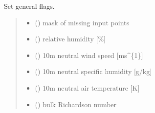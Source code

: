 \documentclass[letterpaper,10pt,english]{sphinxmanual}
\begin{document}
\begin{fulllineitems}
\label{\detokenize{users_guide:AirSeaFluxCode.util_subs.set_flag}}
\pysigstartsignatures
\pysiglinewithargsret
{}
{\sphinxparamcomma {}\sphinxparamcomma {}\sphinxparamcomma {}\sphinxparamcomma {}\sphinxparamcomma {}\sphinxparamcomma {}\sphinxparamcomma {}\sphinxparamcomma {}\sphinxparamcomma {}}
{}
\pysigstopsignatures
\sphinxAtStartPar
Set general flags.
\begin{quote}\begin{description}
\begin{itemize}
\item {}
\sphinxAtStartPar
{} () \textendash{} mask of missing input points

\item {}
\sphinxAtStartPar
{} () \textendash{} relative humidity             {[}\%{]}

\item {}
\sphinxAtStartPar
{} () \textendash{} 10m neutral wind speed        {[}ms\textasciicircum{}\{\sphinxhyphen{}1\}{]}

\item {}
\sphinxAtStartPar
{} () \textendash{} 10m neutral specific humidity {[}g/kg{]}

\item {}
\sphinxAtStartPar
{} () \textendash{} 10m neutral air temperature   {[}K{]}

\item {}
\sphinxAtStartPar
{} () \textendash{} bulk Richardson number


\end{itemize}
\end{description}
\end{quote}
\end{fulllineitems}
\end{document}
